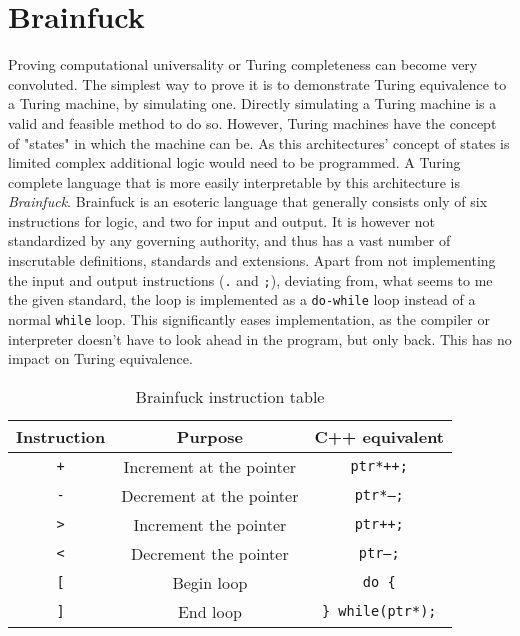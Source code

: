 \section{Brainfuck}
Proving computational universality or Turing completeness can become very convoluted. The simplest way to prove it is to demonstrate Turing equivalence to a Turing machine, by simulating one. Directly simulating a Turing machine is a valid and feasible method to do so. However, Turing machines have the concept of "states" in which the machine can be. As this architectures' concept of states is limited complex additional logic would need to be programmed. A Turing complete language that is more easily interpretable by this architecture is \textit{Brainfuck}. Brainfuck is an esoteric language that generally consists only of six instructions for logic, and two for input and output. It is however not standardized by any governing authority, and thus has a vast number of inscrutable definitions, standards and extensions. Apart from not implementing the input and output instructions (\texttt{.} and \texttt{;}), deviating from, what seems to me the given standard, the loop is implemented as a \texttt{do-while} loop instead of a normal \texttt{while} loop. This significantly eases implementation, as the compiler or interpreter doesn't have to look ahead in the program, but only back. This has no impact on Turing equivalence. 

\begin{table}[H]
\begin{center}
\begin{tabular}{ccc}
Instruction    & Purpose                  & C++ equivalent                       \\ \hline
\texttt{+}             & Increment at the pointer & \texttt{ptr*++;}                   \\
\texttt{-}               & Decrement at the pointer & \texttt{ptr*--;}                   \\
\texttt{\textgreater{}} & Increment the pointer    & \texttt{ptr++;}                    \\
\texttt{\textless{}}   & Decrement the pointer    & \texttt{ptr--;}                    \\
\texttt{{[}}            & Begin loop               & \texttt{do \{}                     \\
\texttt{{]}}            & End loop              & \texttt{\} while(ptr*);}
\end{tabular}
\end{center}
\caption{Brainfuck instruction table}
\label{tab:brainfuck-instructions}
\end{table}

